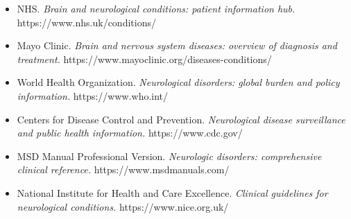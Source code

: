 \begin{itemize}
    \item NHS. \textit{Brain and neurological conditions: patient information hub.} https://www.nhs.uk/conditions/
    \item Mayo Clinic. \textit{Brain and nervous system diseases: overview of diagnosis and treatment.} https://www.mayoclinic.org/diseases-conditions/
    \item World Health Organization. \textit{Neurological disorders: global burden and policy information.} https://www.who.int/
    \item Centers for Disease Control and Prevention. \textit{Neurological disease surveillance and public health information.} https://www.cdc.gov/
    \item MSD Manual Professional Version. \textit{Neurologic disorders: comprehensive clinical reference.} https://www.msdmanuals.com/
    \item National Institute for Health and Care Excellence. \textit{Clinical guidelines for neurological conditions.} https://www.nice.org.uk/
\end{itemize}
